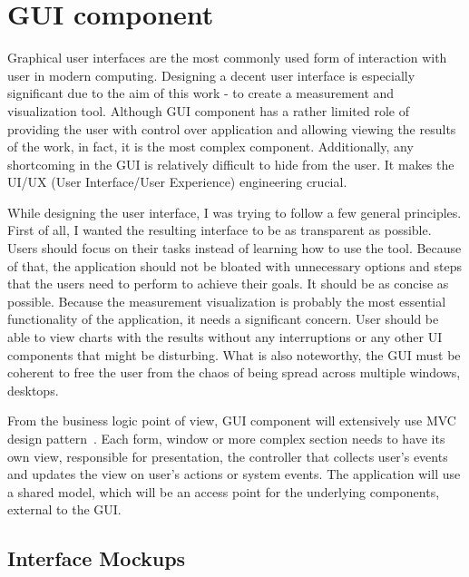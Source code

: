 %
\section{GUI component}
\label{sec:arch_gui}

Graphical user interfaces are the most commonly used form of interaction with user in modern computing. Designing a decent user interface is especially significant due to the aim of this work - to create a measurement and visualization tool. Although GUI component has a rather limited role of providing the user with control over application and allowing viewing the results of the work, in fact, it is the most complex component. Additionally, any shortcoming in the GUI is relatively difficult to hide from the user. It makes the UI/UX (User Interface/User Experience) engineering crucial.

While designing the user interface, I was trying to follow a few general principles. First of all, I wanted the resulting interface to be as transparent as possible. Users should focus on their tasks instead of learning how to use the tool. Because of that, the application should not be bloated with unnecessary options and steps that the users need to perform to achieve their goals. It should be as concise as possible. Because the measurement visualization is probably the most essential functionality of the application, it needs a significant concern. User should be able to view charts with the results without any interruptions or any other UI components that might be disturbing. What is also noteworthy, the GUI must be coherent to free the user from the chaos of being spread across multiple windows, desktops.

From the business logic point of view, GUI component will extensively use MVC design pattern~\cite{gamma1995}. Each form, window or more complex section needs to have its own view, responsible for presentation, the controller that collects user's events and updates the view on user\rq{}s actions or system events. The application will use a shared model, which will be an access point for the underlying components, external to the GUI.

\subsection{Interface Mockups}

